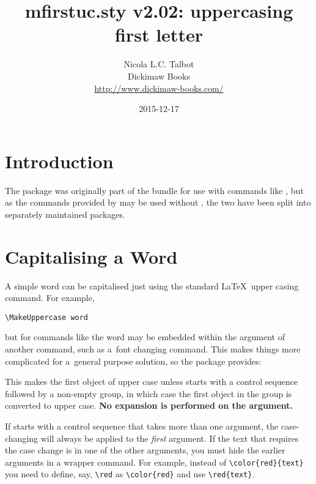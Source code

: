 \documentclass{nlctdoc}
\begin{document}
 \title{mfirstuc.sty v2.02: 
uppercasing first letter}
 \author{Nicola L.C. Talbot\\[10pt]
Dickimaw Books\\
\url{http://www.dickimaw-books.com/}}

 \date{2015-12-17}
 \maketitle
 \tableofcontents

 \section{Introduction}
 \label{sec:intro}

The  package was originally part of the
 bundle for use with commands like , but
as the commands provided by  may be used without
, the two have been split into separately
maintained packages.

\section{Capitalising a Word}
\label{sec:makefirstuc}

A simple word can be capitalised just using the standard \LaTeX\
upper casing command. For example,
\begin{verbatim}
\MakeUppercase word
\end{verbatim}
but for commands like  the word may be embedded within the
argument of another command, such as a~font changing command. This
makes things more complicated for a~general purpose solution, so
the \styfmt{mfirstuc} package provides:
\begin{definition}[\DescribeMacro{\makefirstuc}]
\end{definition}
This makes the first object of
 upper case unless  starts with a control
sequence followed by a non-empty group, in which case the first
object in the group is converted to upper case.
\textbf{No expansion is performed on the argument.}

\begin{important}
If  starts with a control sequence that takes more than
one argument, the case-changing will always be applied to the
\emph{first} argument. If the text that requires the case change is
in one of the other arguments, you must hide the earlier arguments
in a wrapper command. For example, instead of \verb|\color{red}{text}|
you need to define, say, \verb|\red| as \verb|\color{red}| and use
\verb|\red{text}|.
\end{important}
\end{document}
